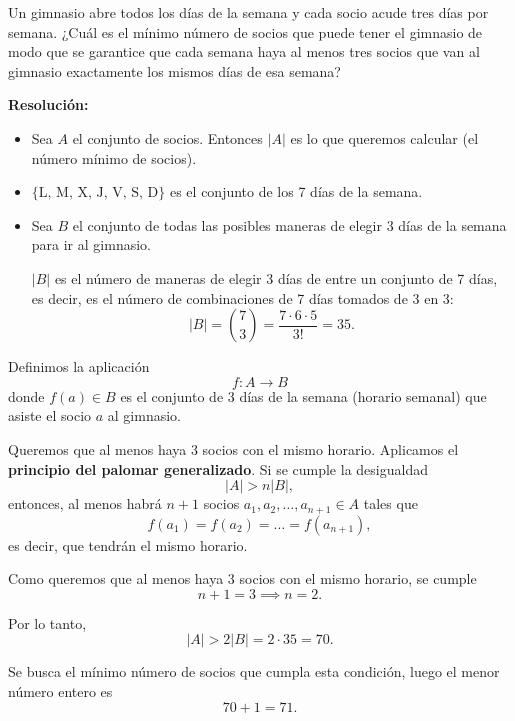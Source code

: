 \documentclass[a4paper,12pt]{article}
\begin{document}
\begin{ejercicio}[title=Ejercicio 43]
Un gimnasio abre todos los días de la semana y cada socio acude tres días por semana.
¿Cuál es el mínimo número de socios que puede tener el gimnasio de modo que se garantice que cada semana haya al menos tres socios que van al gimnasio exactamente los mismos días de esa semana?

\tcblower
\textbf{Resolución:}

\begin{itemize}

\item Sea $A$ el conjunto de socios. Entonces $|A|$ es lo que queremos calcular (el número mínimo de socios).

\item $\{\text{L, M, X, J, V, S, D}\}$ es el conjunto de los 7 días de la semana.

\item Sea $B$ el conjunto de todas las posibles maneras de elegir 3 días de la semana para ir al gimnasio.

$|B|$ es el número de maneras de elegir 3 días de entre un conjunto de 7 días, es decir, es el número de combinaciones de 7 días tomados de 3 en 3:
\[
|B| = \binom{7}{3} = \frac{7 \cdot 6 \cdot 5}{3!} = 35.
\]

\end{itemize}

\vspace{0.5em}

Definimos la aplicación
\[
f : A \to B
\]
donde $f(a) \in B$ es el conjunto de 3 días de la semana (horario semanal) que asiste el socio $a$ al gimnasio.

\vspace{0.5em}

Queremos que al menos haya 3 socios con el mismo horario. Aplicamos el \textbf{principio del palomar generalizado}. Si se cumple la desigualdad
\[
|A| > n |B|,
\]
entonces, al menos habrá $n+1$ socios $a_1, a_2, \dots, a_{n+1} \in A$ tales que
\[
f(a_1) = f(a_2) = \dots = f(a_{n+1}),
\]
es decir, que tendrán el mismo horario.

\vspace{0.5em}

Como queremos que al menos haya 3 socios con el mismo horario, se cumple
\[
n+1 = 3 \implies n = 2.
\]

Por lo tanto,
\[
|A| > 2 |B| = 2 \cdot 35 = 70.
\]

Se busca el mínimo número de socios que cumpla esta condición, luego el menor número entero es
\[
70 + 1 = \boxed{71}.
\]

\end{ejercicio}
\end{document}

